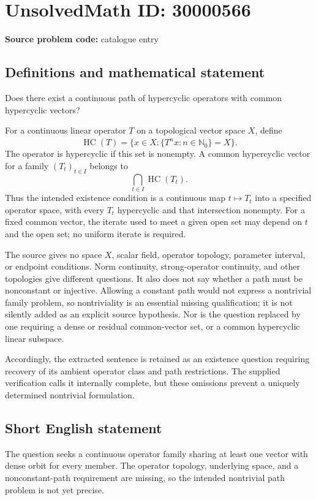 \documentclass[11pt]{article}
\newcommand{\N}{\mathbb{N}}
\begin{document}
\section*{UnsolvedMath ID: 30000566}
\textbf{Source problem code:} catalogue entry
\subsection{Definitions and mathematical statement}
Does there exist a continuous path of hypercyclic operators with common hypercyclic vectors?

For a continuous linear operator $T$ on a topological vector space $X$, define
\[
 \operatorname{HC}(T)=
 \{x\in X:\overline{\{T^nx:n\in\N_0\}}=X\}.
\]
The operator is hypercyclic if this set is nonempty. A common hypercyclic vector for a family $(T_t)_{t\in I}$ belongs to
\[
 \bigcap_{t\in I}\operatorname{HC}(T_t).
\]
Thus the intended existence condition is a continuous map $t\mapsto T_t$ into a specified operator space, with every $T_t$ hypercyclic and that intersection nonempty. For a fixed common vector, the iterate used to meet a given open set may depend on $t$ and the open set; no uniform iterate is required.

The source gives no space $X$, scalar field, operator topology, parameter interval, or endpoint conditions. Norm continuity, strong-operator continuity, and other topologies give different questions. It also does not say whether a path must be nonconstant or injective. Allowing a constant path would not express a nontrivial family problem, so nontriviality is an essential missing qualification; it is not silently added as an explicit source hypothesis. Nor is the question replaced by one requiring a dense or residual common-vector set, or a common hypercyclic linear subspace.

Accordingly, the extracted sentence is retained as an existence question requiring recovery of its ambient operator class and path restrictions. The supplied verification calls it internally complete, but these omissions prevent a uniquely determined nontrivial formulation.
\subsection{Short English statement}
The question seeks a continuous operator family sharing at least one vector with dense orbit for every member. The operator topology, underlying space, and a nonconstant-path requirement are missing, so the intended nontrivial path problem is not yet precise.
\end{document}
